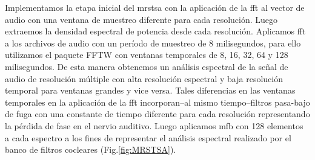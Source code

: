 Implementamos la etapa inicial del \gls{mrstsa} con la aplicación de la \gls{fft} al vector de audio con una ventana de muestreo diferente para cada resolución. Luego extraemos la densidad espectral de potencia desde cada resolución. Aplicamos \gls{fft} a los archivos de audio con un período de muestreo de 8 milisegundos, para ello utilizamos el paquete FFTW \cite{FFTW05, fftw} con ventanas temporales de 8, 16, 32, 64 y 128 milisegundos. De esta manera obtenemos un análisis espectral de la señal de audio de resolución múltiple con alta resolución espectral y baja resolución temporal para ventanas grandes y vice versa. Tales diferencias en las ventanas temporales en la aplicación de la \gls{fft} incorporan--al mismo tiempo--filtros pasa-bajo de fuga con una constante de tiempo diferente para cada resolución representando la pérdida de fase en el nervio auditivo. Luego aplicamos \gls{mfb} con 128 elementos a cada espectro a los fines de representar el análisis espectral realizado por el banco de filtros cocleares (Fig.\ref{fig:MRSTSA}).


